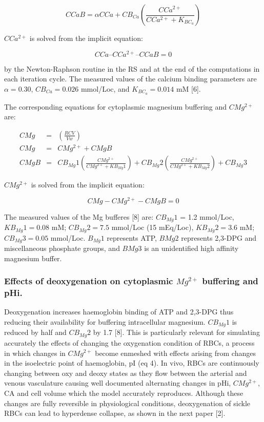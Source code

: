 \documentclass[a4paper]{article}
\newcommand{\cell}[1]{C#1}
\newcommand{\KBCa}{K_{{BC}_a}}
\newcommand{\CMgtp}{\cell{Mg^{2+}}}
\newcommand{\CCatp}{\cell{Ca^{2+}}}
\newcommand{\CCa}{\cell{Ca}}
\newcommand{\CCaB}{\cell{CaB}}
\newcommand{\CBCa}{\cell{B_{Ca}}}
\newcommand{\CMgB}{\cell{MgB}}
\newcommand{\CMg}{\cell{Mg}}
\begin{document}
\begin{equation}
\CCaB = \alpha\CCa + \CBCa\left(\frac{\CCatp}{\CCatp + \KBCa}\right)
\end{equation}

$CCa^{2+}$ is solved from the implicit equation: 

\begin{equation}
\CCa – \CCatp – \CCaB = 0  
\end{equation}

by the Newton-Raphson routine in the RS and at the end of the computations in each iteration cycle.  The measured values of the calcium binding parameters are $\alpha = 0.30$, $\CBCa = 0.026$ mmol/Loc, and $\KBCa = 0.014$ mM [6].

The corresponding equations for cytoplasmic magnesium buffering and $CMg^{2+}$ are:

\begin{eqnarray}
\CMg &=& \left(\frac{RCV}{Vw}\right)\\
\CMg &=& \CMgtp + \CMgB\\
\CMgB &=& CB_{Mg}1\left(\frac{\CMgtp}{\CMgtp+KB_{Mg}1}\right)+CB_{Mg}2\left(\frac{\CMgtp}{\CMgtp+KB_{Mg}2}\right)+CB_{Mg}3
\end{eqnarray}

$\CMgtp$ is solved from the implicit equation: 

\begin{equation}
\CMg - \CMgtp - \CMgB = 0
\end{equation}


The measured values of the Mg bufferes [8] are: $CB_{Mg}1$ = 1.2 mmol/Loc, $KB_{Mg}1 = 0.08$ mM; $CB_{Mg}2 = 7.5$ mmol/Loc (15 mEq/Loc), $KB_{Mg}2 = 3.6$ mM; $CB_{Mg}3 = 0.05$ mmol/Loc. $B_{Mg}1$ represents ATP, $BMg2$ represents 2,3-DPG and miscellaneous phosphate groups, and $BMg3$ is an unidentified high affinity magnesium buffer.  



\subsubsection{Effects of deoxygenation on cytoplasmic $Mg^{2+}$ buffering and pHi.}
Deoxygenation increases haemoglobin binding of ATP and 2,3-DPG thus reducing their availability for buffering intracellular magnesium.  $CB_{Mg}1$ is reduced by half and $CB_{Mg}2$ by 1.7 [8].  This is particularly relevant for simulating accurately the effects of changing the oxygenation condition of RBCs, a process in which changes in $CMg^{2+}$ become enmeshed with effects arising from changes in the isoelectric point of haemoglobin, pI (eq 4).  In vivo, RBCs are continuously changing between oxy and deoxy states as they flow between the arterial and venous vasculature causing well documented alternating changes in pHi, $CMg^{2+}$, CA and cell volume which the model accurately reproduces.  Although these changes are fully reversible in physiological conditions, deoxygenation of sickle RBCs can lead to hyperdense collapse, as shown in the next paper [2]. 
\end{document}
